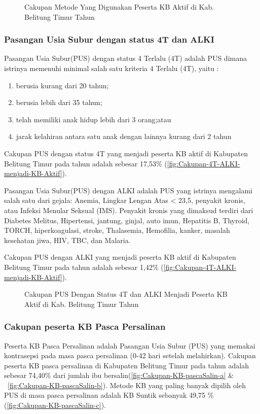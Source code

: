 \begin{figure}[H]
    \centering
    \caption{Cakupan Metode Yang Digunakan Peserta KB Aktif di Kab. Belitung Timur Tahun \tP}
    \label{fig:Cakupan-KB-aktif-c}
\end{figure}

\subsubsection{Pasangan Usia Subur dengan status 4T dan ALKI}
Pasangan Usia Subur(PUS) dengan status 4 Terlalu (4T) adalah PUS dimana istrinya memenuhi minimal salah satu kriteria 4 Terlalu (4T), yaitu :
\begin{enumerate}
	\item berusia kurang dari 20 tahun;
	\item berusia lebih dari 35 tahun;
	\item telah memiliki anak hidup lebih dari 3 orang;atau
	\item jarak kelahiran antara satu anak dengan lainnya kurang dari 2 tahun
\end{enumerate}

Cakupan PUS dengan status 4T yang menjadi peserta KB aktif di Kabupaten Belitung Timur pada tahun \tP  adalah sebesar 17,53\% (\autoref{fig:Cakupan-4T-ALKI-menjadi-KB-Aktif}).

Pasangan Usia Subur(PUS) dengan ALKI adalah PUS yang istrinya mengalami salah satu dari gejala: Anemia, Lingkar Lengan Atas < 23,5, penyakit kronis, atau Infeksi Menular Seksual (IMS).
Penyakit kronis yang dimaksud terdiri dari Diabetes Melitus, Hipertensi, jantung, ginjal, auto imun, Hepatitis B, Thyroid, TORCH, hiperkoagulasi, stroke, Thalasemia, Hemofilia, kanker, masalah kesehatan jiwa, HIV, TBC, dan Malaria.

Cakupan PUS dengan ALKI yang menjadi peserta KB aktif di Kabupaten Belitung Timur pada tahun \tP  adalah sebesar 1,42\% (\autoref{fig:Cakupan-4T-ALKI-menjadi-KB-Aktif}).

\begin{figure}[H]
	\centering
	\caption{Cakupan PUS Dengan Status 4T dan ALKI Menjadi Peserta KB Aktif di Kab. Belitung Timur Tahun \tP}
	\label{fig:Cakupan-4T-ALKI-menjadi-KB-Aktif}
\end{figure}

\subsubsection{Cakupan peserta KB Pasca Persalinan}
Peserta KB Pasca Persalinan adalah Pasangan Usia Subur (PUS) yang memakai kontrasepsi pada masa pasca persalinan (0-42 hari setelah melahirkan). Cakupan peserta KB pasca persalinan di Kabupaten Belitung Timur pada tahun \tP adalah sebesar 74,40\% dari jumlah ibu bersalin(\autoref{fig:Cakupan-KB-pascaSalin-a} \& ~\autoref{fig:Cakupan-KB-pascaSalin-b}). Metode KB yang paling banyak dipilih oleh PUS di masa pasca persalinan adalah KB Suntik sebanyak 49,75 \% (\autoref{fig:Cakupan-KB-pascaSalin-c}).

